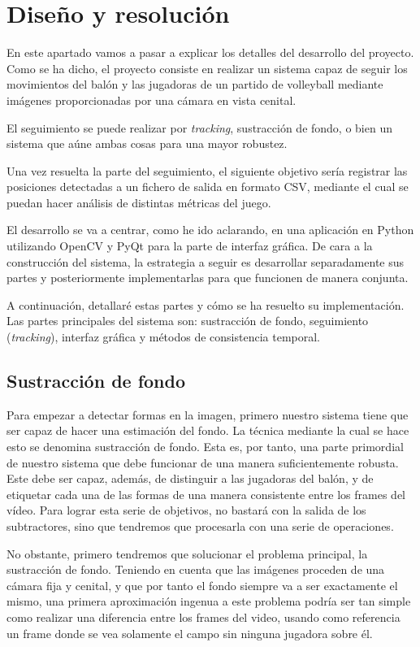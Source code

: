 \section{Diseño y resolución}

En este apartado vamos a pasar a explicar los detalles del desarrollo del proyecto. Como se ha dicho, el proyecto consiste en realizar un sistema capaz de seguir los movimientos del balón y las jugadoras de un partido de volleyball mediante imágenes proporcionadas por una cámara en vista cenital.

El seguimiento se puede realizar por \textit{tracking}, sustracción de fondo, o bien un sistema que aúne ambas cosas para una mayor robustez.

Una vez resuelta la parte del seguimiento, el siguiente objetivo sería registrar las posiciones detectadas a un fichero de salida en formato CSV, mediante el cual se puedan hacer análisis de distintas métricas del juego.

El desarrollo se va a centrar, como he ido aclarando, en una aplicación en Python utilizando OpenCV y PyQt para la parte de interfaz gráfica. De cara a la construcción del sistema, la estrategia a seguir es desarrollar separadamente sus partes y posteriormente implementarlas para que funcionen de manera conjunta.

A continuación, detallaré estas partes y cómo se ha resuelto su implementación. Las partes principales del sistema son: sustracción de fondo, seguimiento (\textit{tracking}), interfaz gráfica y métodos de consistencia temporal.

\subsection{Sustracción de fondo}
Para empezar a detectar formas en la imagen, primero nuestro sistema tiene que ser capaz de hacer una estimación del fondo. La técnica mediante la cual se hace esto se denomina sustracción de fondo. Esta es, por tanto, una parte primordial de nuestro sistema que debe funcionar de una manera suficientemente robusta. Este debe ser capaz, además, de distinguir a las jugadoras del balón, y de etiquetar cada una de las formas de una manera consistente entre los frames del vídeo. Para lograr esta serie de objetivos, no bastará con la salida de los subtractores, sino que tendremos que procesarla con una serie de operaciones.

No obstante, primero tendremos que solucionar el problema principal, la sustracción de fondo. Teniendo en cuenta que las imágenes proceden de una cámara fija y cenital, y que por tanto el fondo siempre va a ser exactamente el mismo, una primera aproximación ingenua a este problema podría ser tan simple como realizar una diferencia entre los frames del video, usando como referencia un frame donde se vea solamente el campo sin ninguna jugadora sobre él.

